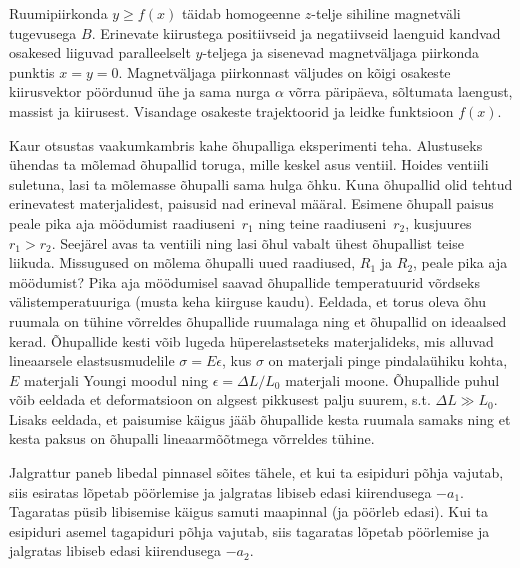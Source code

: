 \documentclass[10pt]{article}
\begin{document}
Ruumipiirkonda $y\ge f(x)$ täidab homogeenne $z$-telje sihiline magnetväli tugevusega $B$. Erinevate kiirustega positiivseid ja negatiivseid laenguid kandvad osakesed liiguvad paralleelselt $y$-teljega ja sisenevad magnetväljaga piirkonda punktis $x=y=0$. Magnetväljaga piirkonnast väljudes on kõigi osakeste kiirusvektor pöördunud ühe ja sama nurga $\alpha$ võrra päripäeva, sõltumata laengust, massist ja kiirusest. Visandage osakeste trajektoorid ja leidke funktsioon $f(x)$.
\probend
\bigskip

\setAuthor{}

Kaur otsustas vaakumkambris kahe õhupalliga eksperimenti teha. Alustuseks ühendas
ta mõlemad õhupallid toruga, mille keskel asus ventiil. Hoides ventiili suletuna,
lasi ta mõlemasse õhupalli sama hulga õhku. Kuna õhupallid olid tehtud erinevatest
materjalidest, paisusid nad erineval määral. Esimene õhupall paisus peale pika aja
möödumist raadiuseni~$r_1$ ning teine raadiuseni~$r_2$, kusjuures $r_1 > r_2$.
Seejärel avas ta ventiili ning lasi õhul vabalt ühest õhupallist teise liikuda.
Missugused on mõlema õhupalli uued raadiused, $R_1$ ja $R_2$, peale pika aja
möödumist? Pika aja möödumisel saavad õhupallide temperatuurid võrdseks
välistemperatuuriga (musta keha kiirguse kaudu). Eeldada, et torus oleva õhu
ruumala on tühine võrreldes õhupallide ruumalaga ning et õhupallid on ideaalsed
kerad. Õhupallide kesti võib lugeda hüperelastseteks materjalideks, mis alluvad
lineaarsele elastsusmudelile $\sigma = E\epsilon$, kus $\sigma$ on materjali pinge
pindalaühiku kohta, $E$ materjali Youngi moodul ning $\epsilon = \Delta L / L_0$
materjali moone. Õhupallide puhul võib eeldada et deformatsioon on algsest
pikkusest palju suurem, s.t. $\Delta L \gg L_0$. Lisaks eeldada, et paisumise
käigus jääb õhupallide kesta ruumala samaks ning et kesta paksus on õhupalli
lineaarmõõtmega võrreldes tühine.
\probend
\bigskip


Jalgrattur paneb libedal pinnasel sõites tähele, et kui ta esipiduri põhja vajutab, siis esiratas lõpetab pöörlemise ja jalgratas libiseb edasi kiirendusega $-a_1$. Tagaratas püsib libisemise käigus samuti maapinnal (ja pöörleb edasi). Kui ta esipiduri asemel tagapiduri põhja vajutab, siis tagaratas lõpetab pöörlemise ja jalgratas libiseb edasi kiirendusega $-a_2$.
\end{document}
